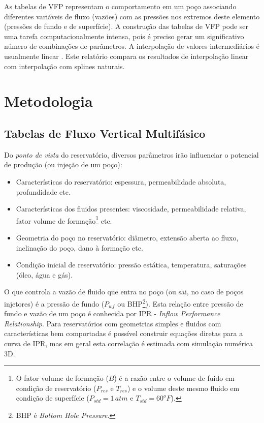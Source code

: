 \documentclass[final,5p]{elsarticle}
\numberwithin{equation}{section}
\begin{document}
    As tabelas de VFP representam o comportamento em um poço associando diferentes variáveis de fluxo (vazões) com as pressões nos extremos deste elemento (pressões de fundo e de superfície). A construção das tabelas de VFP pode ser uma tarefa computacionalmente intensa, pois é preciso gerar um significativo número de combinações de parâmetros. A interpolação de valores intermediários é usualmente linear \cite{computer2022cmg}\cite{schlumberger2009technical}. Este relatório compara os resultados de interpolação linear com interpolação com splines naturais.

\section{Metodologia}

    \subsection{Tabelas de Fluxo Vertical Multifásico}

        Do \emph{ponto de vista} do reservatório, diversos parâmetros irão influenciar o potencial de produção (ou injeção de um poço):

        \begin{itemize}
            \item Características do reservatório: espessura, permeabilidade absoluta, profundidade etc.
            \item Características dos fluidos presentes: viscosidade, permeabilidade relativa, fator volume de formação\footnote{O fator volume de formação ($B$) é a razão entre o volume de fuido em condição de reservatório ($P_{res}$ e $T_{res}$) e o volume deste mesmo fluido em condição de superfície ($P_{std}=1 \, atm$ e $T_{std}=60^oF$).} etc.
            \item Geometria do poço no reservatório: diâmetro, extensão aberta ao fluxo, inclinação do poço, dano à formação etc.
            \item Condição inicial de reservatório: pressão estática, temperatura, saturações (óleo, água e gás).
        \end{itemize}
        
        O que controla a vazão de fluido que entra no poço (ou sai, no caso de poços injetores) é a pressão de fundo ($P_{wf}$ ou BHP\footnote{BHP é \emph{Bottom Hole Pressure}.}). Esta relação entre pressão de fundo e vazão de um poço é conhecida por IPR - \emph{Inflow Performance Relationship}. Para reservatórios com geometrias simples e fluidos com características bem comportadas é possível construir equações diretas para a curva de IPR, mas em geral esta correlação é estimada com simulação numérica 3D.
\end{document}
